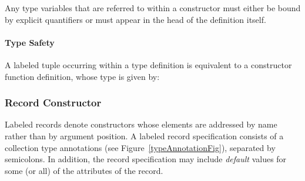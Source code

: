 \begin{aside}
Any type variables that are referred to within a  constructor must either be bound by explicit quantifiers or must appear in the head of the  definition itself.
\end{aside}

\paragraph{Type Safety}
A labeled tuple occurring within a type definition is equivalent to a constructor function definition, whose type is given by:
\begin{prooftree}
\end{prooftree}

\subsubsection{Record Constructor}
\label{aggCon}
Labeled records denote constructors whose elements are addressed by name rather than by argument position. A labeled record specification consists of a collection type annotations (see Figure~\vref{typeAnnotationFig}), separated by semicolons. In addition, the record specification may include \emph{default} values for some (or all) of the attributes of the record.

